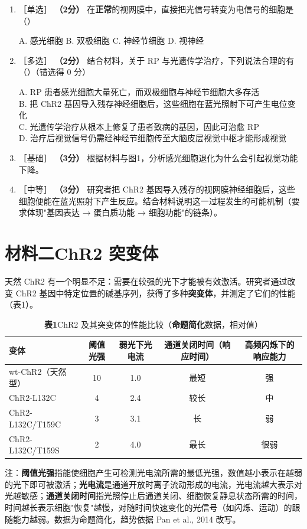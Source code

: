 \documentclass[UTF8,a4paper,11pt]{ctexart}
\newcommand{\pt}[1]{\textbf{（#1分）}}
\newcommand{\lv}[1]{{\small\color{deepgreen}［#1］}}
\newcommand{\key}[1]{\textbf{\color{deepred}#1}}
\newcommand{\choice}[1]{\par\smallskip\noindent #1\par}
\begin{document}
\begin{enumerate}[leftmargin=2.2em,itemsep=5pt]
\item \lv{单选} \pt{2} 在\textbf{正常}的视网膜中，直接把光信号转变为电信号的细胞是（\quad）\\
\choice{A. 感光细胞 \quad B. 双极细胞 \quad C. 神经节细胞 \quad D. 视神经}

\item \lv{多选} \pt{2} 结合材料，关于 RP 与光遗传学治疗，下列说法合理的有（\quad）（错选得 0 分）\\
\choice{A. RP 患者感光细胞大量死亡，而双极细胞与神经节细胞大多存活\\
B. 把 ChR2 基因导入残存神经细胞后，这些细胞在蓝光照射下可产生电位变化\\
C. 光遗传学治疗从根本上修复了患者致病的基因，因此可治愈 RP\\
D. 治疗后视觉信号仍需经神经节细胞传至大脑皮层视觉中枢才能形成视觉}

\item \lv{基础} \pt{3} 根据材料与图1，分析感光细胞退化为什么会引起视觉功能下降。

\item \lv{中等} \pt{3} 研究者把 ChR2 基因导入残存的视网膜神经细胞后，这些细胞便能在蓝光照射下产生反应。结合材料说明这一过程发生的可能机制（要求体现"基因表达 → 蛋白质功能 → 细胞功能"的链条）。
\end{enumerate}

\section{材料二\quad ChR2 突变体}

天然 ChR2 有一个明显不足：需要在较强的光下才能被有效激活。研究者通过改变 ChR2 基因中特定位置的碱基序列，获得了多种\textbf{突变体}，并测定了它们的性能（表1）。

\begin{table}[H]
\centering\small
\caption*{\textbf{表1}\quad ChR2 及其突变体的性能比较（\key{命题简化}数据，相对值）}
\begin{tabular}{@{}lcccc@{}}
\toprule
\textbf{变体} & \textbf{阈值光强} & \textbf{弱光下光电流} & \textbf{通道关闭时间（响应时间）} & \textbf{高频闪烁下的响应能力} \\
\midrule
wt-ChR2（天然型） & 10 & 1.0 & 最短 & 强 \\
ChR2-L132C & 4 & 2.4 & 较长 & 中 \\
ChR2-L132C/T159C & 3 & 3.1 & 长 & 弱 \\
ChR2-L132C/T159S & 2 & 4.0 & 最长 & 很弱 \\
\bottomrule
\end{tabular}

\smallskip
\parbox{0.94\textwidth}{\footnotesize 注：\textbf{阈值光强}指能使细胞产生可检测光电流所需的最低光强，数值越小表示在越弱的光下即可被激活；\textbf{光电流}是通道开放时离子流动形成的电流，光电流越大表示对光越敏感；\textbf{通道关闭时间}指光照停止后通道关闭、细胞恢复静息状态所需的时间，时间越长表示细胞"恢复"越慢，对随时间快速变化的光信号（如闪烁、运动）的跟随能力越弱。数据为命题简化，趋势依据 Pan et al., 2014 改写。}
\end{table}
\end{document}
